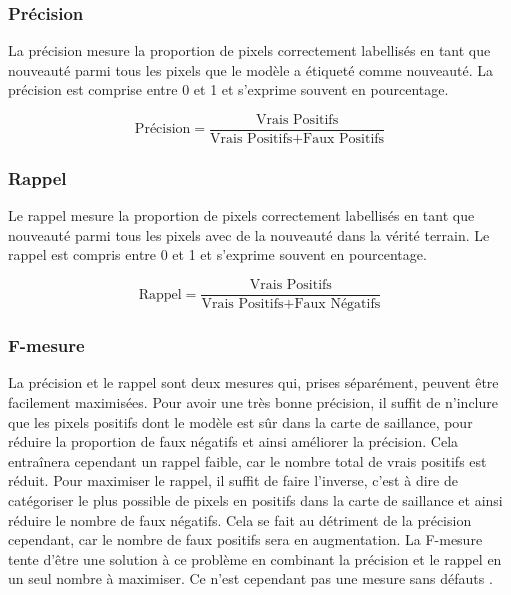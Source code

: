 	\subsubsection{Précision}

	La précision mesure la proportion de pixels correctement labellisés en tant que nouveauté parmi tous les pixels que le modèle a étiqueté comme nouveauté. La précision est comprise entre 0 et 1 et s'exprime souvent en pourcentage.
	
	\begin{equation}
		\text{Précision} = \frac{\text{Vrais Positifs}}{\text{Vrais Positifs} + \text{Faux Positifs}}
	\end{equation}

	\subsubsection{Rappel}

	Le rappel mesure la proportion de pixels correctement labellisés en tant que nouveauté parmi tous les pixels avec de la nouveauté dans la vérité terrain. Le rappel est compris entre 0 et 1 et s'exprime souvent en pourcentage.

	\begin{equation}
		\text{Rappel} = \frac{\text{Vrais Positifs}}{\text{Vrais Positifs} + \text{Faux Négatifs}}
	\end{equation}

	\subsubsection{F-mesure}

	La précision et le rappel sont deux mesures qui, prises séparément, peuvent être facilement maximisées. Pour avoir une très bonne précision, il suffit de n'inclure que les pixels positifs dont le modèle est sûr dans la carte de saillance, pour réduire la proportion de faux négatifs et ainsi améliorer la précision. Cela entraînera cependant un rappel faible, car le nombre total de vrais positifs est réduit. Pour maximiser le rappel, il suffit de faire l'inverse, c'est à dire de catégoriser le plus possible de pixels en positifs dans la carte de saillance et ainsi réduire le nombre de faux négatifs. Cela se fait au détriment de la précision cependant, car le nombre de faux positifs sera en augmentation. La F-mesure \cite{hripcsak-fmeasure} tente d'être une solution à ce problème en combinant la précision et le rappel en un seul nombre à maximiser. Ce n'est cependant pas une mesure sans défauts \cite{powers-fmeasure}.

